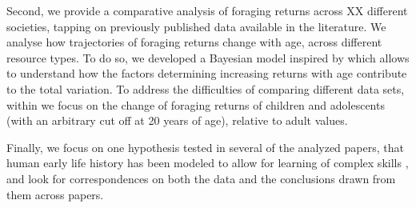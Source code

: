 Second, we provide a comparative analysis of foraging returns across XX different societies, tapping on previously published data available in the literature. 
We analyse how trajectories of foraging returns change with age, across different resource types. To do so, we developed a Bayesian model inspired by \cite{koster_life_2019} which allows to understand how the factors determining increasing returns with age contribute to the total variation. 
To address the difficulties of comparing different data sets, within we focus on the change of foraging returns of children and adolescents (with an arbitrary cut off at 20 years of age), relative to adult values.

Finally, we focus on one hypothesis tested in several of the analyzed papers, that human early life history has been modeled to allow for learning of complex skills \cite{kaplan_theory_2000}, and look for correspondences on both the data and the conclusions drawn from them across papers.  









